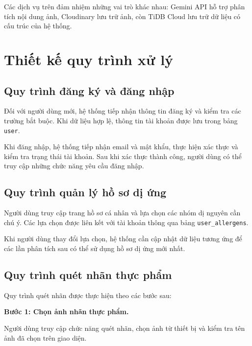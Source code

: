 Các dịch vụ trên đảm nhiệm những vai trò khác nhau: Gemini API hỗ trợ phân tích nội dung ảnh, Cloudinary lưu trữ ảnh, còn TiDB Cloud lưu trữ dữ liệu có cấu trúc của hệ thống.


\section{Thiết kế quy trình xử lý}

\subsection{Quy trình đăng ký và đăng nhập}

Đối với người dùng mới, hệ thống tiếp nhận thông tin đăng ký và kiểm tra các trường bắt buộc. Khi dữ liệu hợp lệ, thông tin tài khoản được lưu trong bảng \texttt{user}.

Khi đăng nhập, hệ thống tiếp nhận email và mật khẩu, thực hiện xác thực và kiểm tra trạng thái tài khoản. Sau khi xác thực thành công, người dùng có thể truy cập những chức năng yêu cầu đăng nhập.

\subsection{Quy trình quản lý hồ sơ dị ứng}

Người dùng truy cập trang hồ sơ cá nhân và lựa chọn các nhóm dị nguyên cần chú ý. Các lựa chọn được liên kết với tài khoản thông qua bảng \texttt{user\_allergens}.

Khi người dùng thay đổi lựa chọn, hệ thống cần cập nhật dữ liệu tương ứng để các lần phân tích sau có thể sử dụng hồ sơ dị ứng mới nhất.

\subsection{Quy trình quét nhãn thực phẩm}

Quy trình quét nhãn được thực hiện theo các bước sau:

\textbf{Bước 1: Chọn ảnh nhãn thực phẩm.}

Người dùng truy cập chức năng quét nhãn, chọn ảnh từ thiết bị và kiểm tra tên ảnh đã chọn trên giao diện.

